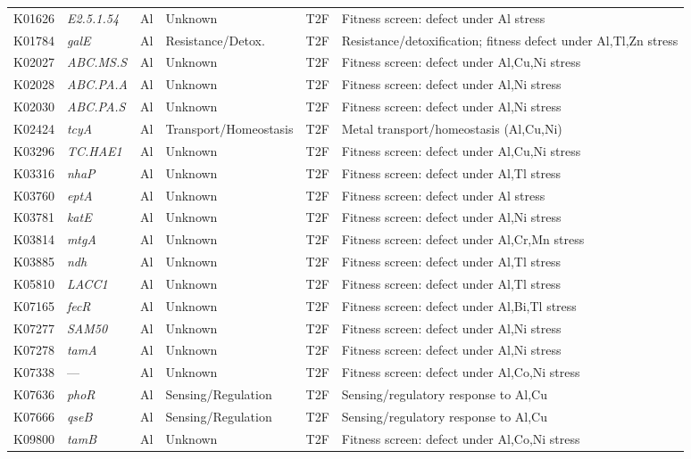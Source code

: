 \documentclass[11pt]{article}
\begin{document}
\begin{longtable}{lllllp{4.8cm}}
K01626 & \textit{E2.5.1.54} & Al & Unknown & T2F & Fitness screen: defect under Al stress \\
K01784 & \textit{galE} & Al & Resistance/Detox. & T2F & Resistance/detoxification; fitness defect under Al,Tl,Zn stress \\
K02027 & \textit{ABC.MS.S} & Al & Unknown & T2F & Fitness screen: defect under Al,Cu,Ni stress \\
K02028 & \textit{ABC.PA.A} & Al & Unknown & T2F & Fitness screen: defect under Al,Ni stress \\
K02030 & \textit{ABC.PA.S} & Al & Unknown & T2F & Fitness screen: defect under Al,Ni stress \\
K02424 & \textit{tcyA} & Al & Transport/Homeostasis & T2F & Metal transport/homeostasis (Al,Cu,Ni) \\
K03296 & \textit{TC.HAE1} & Al & Unknown & T2F & Fitness screen: defect under Al,Cu,Ni stress \\
K03316 & \textit{nhaP} & Al & Unknown & T2F & Fitness screen: defect under Al,Tl stress \\
K03760 & \textit{eptA} & Al & Unknown & T2F & Fitness screen: defect under Al stress \\
K03781 & \textit{katE} & Al & Unknown & T2F & Fitness screen: defect under Al,Ni stress \\
K03814 & \textit{mtgA} & Al & Unknown & T2F & Fitness screen: defect under Al,Cr,Mn stress \\
K03885 & \textit{ndh} & Al & Unknown & T2F & Fitness screen: defect under Al,Tl stress \\
K05810 & \textit{LACC1} & Al & Unknown & T2F & Fitness screen: defect under Al,Tl stress \\
K07165 & \textit{fecR} & Al & Unknown & T2F & Fitness screen: defect under Al,Bi,Tl stress \\
K07277 & \textit{SAM50} & Al & Unknown & T2F & Fitness screen: defect under Al,Ni stress \\
K07278 & \textit{tamA} & Al & Unknown & T2F & Fitness screen: defect under Al,Ni stress \\
K07338 & --- & Al & Unknown & T2F & Fitness screen: defect under Al,Co,Ni stress \\
K07636 & \textit{phoR} & Al & Sensing/Regulation & T2F & Sensing/regulatory response to Al,Cu \\
K07666 & \textit{qseB} & Al & Sensing/Regulation & T2F & Sensing/regulatory response to Al,Cu \\
K09800 & \textit{tamB} & Al & Unknown & T2F & Fitness screen: defect under Al,Co,Ni stress \\

\end{longtable}
\end{document}
